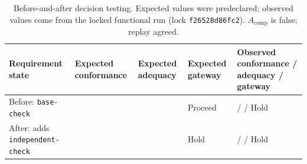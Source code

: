 \begin{table}[pos=t]
\centering\small
\caption{Before-and-after decision testing. Expected values were predeclared; observed values come from the locked functional run (lock \texttt{f26528d86fc2}). $A_{\mathrm{comp}}$ is false; replay agreed.}
\label{tab:functional-results}
\label{tab:functional-protocol}
\begin{tabularx}{\textwidth}{@{}L{.31\textwidth}L{.13\textwidth}L{.13\textwidth}L{.13\textwidth}Y@{}}
\toprule
Requirement state & Expected conformance & Expected adequacy & Expected gateway & Observed conformance / adequacy / gateway \\
\midrule
Before: \texttt{base-check} & \Pass{} & \Pass{} & Proceed & \Pass{} / \Fail{} / Hold \\
After: adds \texttt{independent-check} & \Pass{} & \Fail{} & Hold & \Pass{} / \Fail{} / Hold \\
\bottomrule
\end{tabularx}
\end{table}
